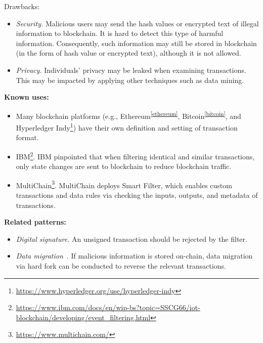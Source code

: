 \documentclass{article}
\begin{document}
Drawbacks: 
\begin{itemize}
  \item \textit{Security.} Malicious users may send the hash values or encrypted text of illegal information to blockchain. It is hard to detect this type of harmful information. Consequently, such information may still be stored in blockchain (in the form of hash value or encrypted text), although it is not allowed.
  

   \item \textit{Privacy.} Individuals' privacy may be leaked when examining transactions. This may be impacted by applying other techniques such as data mining.
   
\end{itemize}



\vspace{0.5em}\noindent \textbf{Known uses:}  
 \begin{itemize}
   \item Many blockchain platforms (e.g., Ethereum\textsuperscript{\ref{ethereum}}, Bitcoin\textsuperscript{\ref{bitcoin}}, and Hyperledger Indy\footnote{\url{https://www.hyperledger.org/use/hyperledger-indy}}) have their own definition and setting of transaction format.
   
   \item IBM\footnote{\url{https://www.ibm.com/docs/en/wip-bs?topic=SSCG66/iot-blockchain/developing/event_filtering.html}}. IBM pinpointed that when filtering identical and similar transactions, only state changes are sent to blockchain to reduce blockchain traffic.
   
   \item MultiChain\footnote{\url{https://www.multichain.com/}}. MultiChain deploys Smart Filter, which enables custom transactions and data rules via checking the inputs, outputs, and metadata of transactions.
 \end{itemize}

\vspace{0.5em}\noindent \textbf{Related patterns:} 

\begin{itemize}
    \item \textit{Digital signature.} An unsigned transaction should be rejected by the filter.
    
    \item \textit{Data migration}~\cite{data_migration}. If malicious information is stored on-chain, data migration via hard fork can be conducted to reverse the relevant transactions.
\end{itemize}
\end{document}

